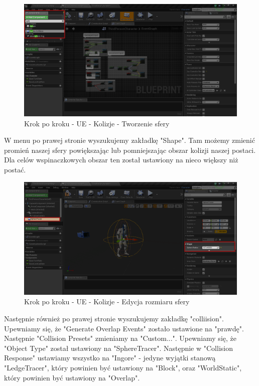 \documentclass[brudnopis]{xmgr}
\begin{document}
\begin{figure}[!htb]
    \begin{center}
    \includegraphics[scale=0.35]{Screeny/UeKrokPoKroku/UE-Climb-Sphere01.png}
    \end{center}
    \caption{Krok po kroku - UE - Kolizje - Tworzenie sfery}
\end{figure}

W menu po prawej stronie wyszukujemy zakładkę "Shape". Tam możemy zmienić promień naszej sfery powiększając lub pomniejszając obszar kolizji naszej postaci. Dla celów wspinaczkowych obszar ten został ustawiony na nieco większy niż postać.

\begin{figure}[!htb]
    \begin{center}
    \includegraphics[scale=0.35]{Screeny/UeKrokPoKroku/UE-Climb-Sphere02.png}
    \end{center}
    \caption{Krok po kroku - UE - Kolizje - Edycja rozmiaru sfery}
\end{figure}

Następnie również po prawej stronie wyszukujemy zakładkę "colliision". Upewniamy się, że "Generate Overlap Events" zostało ustawione na "prawdę". Następnie "Collision Presets" zmieniamy na "Custom...". Upewniamy się, że "Object Type" został ustawiony na "SphereTracer". Następnie w "Collision Response" ustawiamy wszystko na "Ingore" - jedyne wyjątki stanową "LedgeTracer", który powinien być ustawiony na "Block", oraz "WorldStatic", który powinien być ustawiony na "Overlap".
\end{document}
